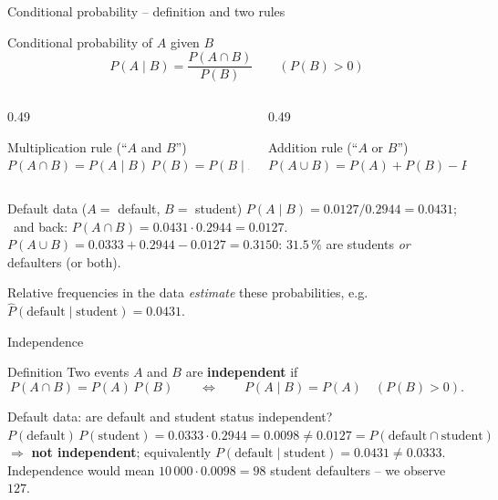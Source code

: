 \documentclass[aspectratio=169,11pt]{beamer}
\begin{document}
\begin{frame}{Conditional probability -- definition and two rules}
  \begin{block}{Conditional probability of $A$ given $B$}
    \[
      P(A\mid B)=\frac{P(A\cap B)}{P(B)}\qquad(P(B)>0)
    \]
  \end{block}
  \smallskip
  \begin{columns}[T]
    \begin{column}{0.49\textwidth}
      \begin{block}{Multiplication rule (``$A$ and $B$'')}
        \centering
        $P(A\cap B)=P(A\mid B)\,P(B)=P(B\mid A)\,P(A)$
      \end{block}
    \end{column}
    \begin{column}{0.49\textwidth}
      \begin{block}{Addition rule (``$A$ or $B$'')}
        \centering
        $P(A\cup B)=P(A)+P(B)-P(A\cap B)$
      \end{block}
    \end{column}
  \end{columns}
  \begin{exampleblock}{Default data ($A=$ default, $B=$ student)}
    $P(A\mid B)=0.0127/0.2944=0.0431$; \ and back:
    $P(A\cap B)=0.0431\cdot0.2944=0.0127$.\\
    $P(A\cup B)=0.0333+0.2944-0.0127=0.3150$: $31.5\,\%$ are students
    \emph{or} defaulters (or both).
  \end{exampleblock}
  {\footnotesize Relative frequencies in the data \emph{estimate} these
  probabilities, e.g.\ $\hat P(\text{default}\mid\text{student})=0.0431$.\par}
\end{frame}

\begin{frame}{Independence}
  \begin{block}{Definition}
    Two events $A$ and $B$ are \textbf{independent} if
    \vspace{-0.3em}
    \[
      P(A\cap B)=P(A)\,P(B)
      \qquad\Longleftrightarrow\qquad
      P(A\mid B)=P(A)\quad(P(B)>0).
    \]
  \end{block}
  \begin{exampleblock}{Default data: are default and student status independent?}
    $P(\text{default})\,P(\text{student})=0.0333\cdot0.2944=0.0098
    \neq0.0127=P(\text{default}\cap\text{student})$\\
    $\Rightarrow$ \textbf{not independent}; equivalently
    $P(\text{default}\mid\text{student})=0.0431\neq0.0333$.\\
    Independence would mean $10\,000\cdot0.0098=98$ student defaulters --
    we observe $127$.
  \end{exampleblock}
\end{frame}
\end{document}
